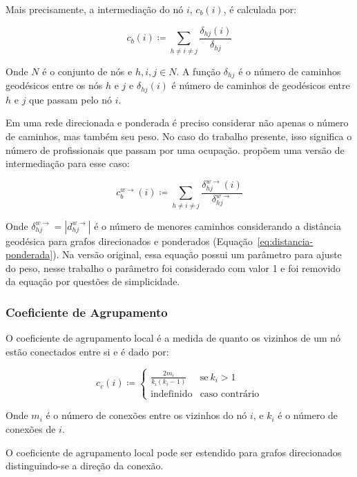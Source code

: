 \documentclass[12pt,a4paper]{article}
\theoremstyle{hypo}
\newcommand{\defn}{\coloneqq} %
\newcommand{\weighteddir}[1]{#1^{w\rightarrow}} %
\begin{document}
Mais precisamente, a intermediação do nó $i$, $c_b(i)$, é calculada por:

\begin{equation}
c_b(i) \defn \sum_{h \neq i \neq j} \frac{\delta_{hj}(i)}{\delta_{hj}}
\end{equation}

Onde $N$ é o conjunto de nós e $h, i, j \in N$. A função $\delta_{hj}$ é o número de caminhos geodésicos entre os nós $h$ e $j$ e $\delta_{hj}(i)$ é número de caminhos de geodésicos entre $h$ e $j$ que passam pelo nó $i$.

Em uma rede direcionada e ponderada é preciso considerar não apenas o número de caminhos, mas também seu peso. No caso do trabalho presente, isso significa o número de profissionais que passam por uma ocupação.  propõem uma versão de intermediação para esse caso:

\begin{equation}
\weighteddir{c}_{b}(i) \defn \sum_{h \neq i \neq j} \frac{\weighteddir{\delta}_{hj}(i)}{\weighteddir{\delta}_{hj}}
\end{equation}

Onde $\weighteddir{\delta}_{hj} = |\weighteddir{d}_{hj}|$ é o número de menores caminhos considerando a distância geodésica para grafos direcionados e ponderados (Equação~\ref{eq:distancia-ponderada}). Na versão original, essa equação possui um parâmetro para ajuste do peso, nesse trabalho o parâmetro foi considerado com valor 1 e foi removido da equação por questões de simplicidade.

\subsubsection{Coeficiente de Agrupamento}

O coeficiente de agrupamento local é a medida de quanto os vizinhos de um nó estão conectados entre si e é dado por:

\begin{equation}
c_c(i) \defn \begin{cases}
    \frac{2m_i}{k_i(k_i - 1)} & \text{se}\ k_i > 1 \\
    \text{indefinido}         & \text{caso contrário}
  \end{cases}
\end{equation}

Onde $m_i$ é o número de conexões entre os vizinhos do nó $i$, e $k_i$ é o número de conexões de $i$.

O coeficiente de agrupamento local pode ser estendido para grafos direcionados distinguindo-se a direção da conexão.
\end{document}
